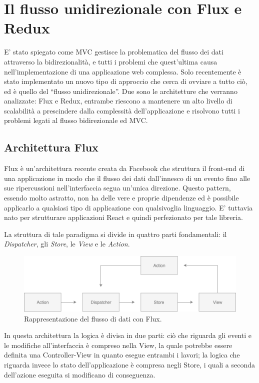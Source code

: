 \chapter{Il flusso unidirezionale con Flux e Redux}
E' stato spiegato come MVC gestisce la problematica del flusso dei dati attraverso la bidirezionalità, e tutti i problemi che quest'ultima causa nell'implementazione di una applicazione web complessa. Solo recentemente è stato implementato un nuovo tipo di approccio che cerca di ovviare a tutto ciò, ed è quello del “flusso unidirezionale”. Due sono le architetture che verranno analizzate: Flux e Redux, entrambe riescono a mantenere un alto livello di scalabilità a prescindere dalla complessità dell'applicazione e risolvono tutti i problemi legati al flusso bidirezionale ed MVC.

\section{Architettura Flux}
\label{FluxArchitecture}
Flux è un'architettura recente creata da Facebook che struttura il front-end di una applicazione in modo che il flusso dei dati dall'innesco di un evento fino alle sue ripercussioni nell'interfaccia segua un'unica direzione.
Questo pattern, essendo molto astratto, non ha delle vere e proprie dipendenze ed è possibile applicarlo a qualsiasi tipo di applicazione con qualsivoglia linguaggio. E' tuttavia nato per strutturare applicazioni React e quindi perfezionato per tale libreria.

La struttura di tale paradigma si divide in quattro parti fondamentali: il \textit{Dispatcher}, gli \textit{Store}, le \textit{View} e le \textit{Action}.

\begin{figure}[h]
\centering
\vspace*{0.5cm} 
\includegraphics[width=14cm]{./images/FluxWorkflow}
\caption{Rappresentazione del flusso di dati con Flux.}
\label{FluxWorkflow}
\vspace*{0.5cm} 
\end{figure}

In questa architettura la logica è divisa in due parti: ciò che riguarda gli eventi e le modifiche all'interfaccia è compreso nella View, la quale potrebbe essere definita una Controller-View in quanto esegue entrambi i lavori; la logica che riguarda invece lo stato dell'applicazione è compresa negli Store, i quali a seconda dell'azione eseguita si modificano di conseguenza.

